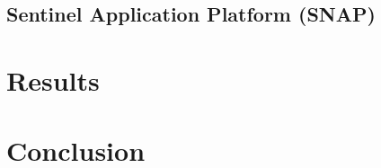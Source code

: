 \documentclass[conference]{IEEEtran}
\begin{document}
		\subsection{Sentinel Application Platform (SNAP)}
		
		
		
		

%
%
%


	\section{Results}
	



	\section{Conclusion}
	






	\nocite{*}
	\printbibliography
	
\end{document}
